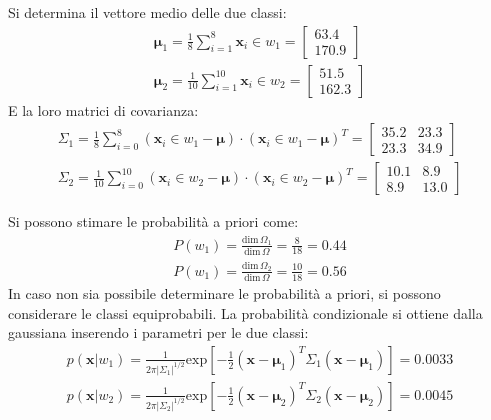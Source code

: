 \documentclass{article}
\numberwithin{equation}{section}
\newcommand{\vect}[1]{\boldsymbol{\mathbf{#1}}}
\begin{document}
Si determina il vettore medio delle due classi:
\begin{gather*}
    \vect{\mu}_1=\displaystyle\frac{1}{8}\sum_{i=1}^{8}\vect{x}_i\in w_1=\begin{bmatrix}
        63.4\\170.9
    \end{bmatrix}\\
    \vect{\mu}_2=\displaystyle\frac{1}{10}\sum_{i=1}^{10}\vect{x}_i\in w_2=\begin{bmatrix}
        51.5\\162.3
    \end{bmatrix}
\end{gather*}
E la loro matrici di covarianza: 
\begin{gather*}
    \Sigma_1=\displaystyle\frac{1}{8}\sum_{i=0}^8(\vect{x}_i\in w_1-\vect{\mu})\cdot(\vect{x}_i\in w_1-\vect{\mu})^T=\begin{bmatrix}
        35.2&23.3\\23.3&34.9
    \end{bmatrix}\\
    \Sigma_2=\displaystyle\frac{1}{10}\sum_{i=0}^{10}(\vect{x}_i\in w_2-\vect{\mu})\cdot(\vect{x}_i\in w_2-\vect{\mu})^T=\begin{bmatrix}
        10.1&8.9\\8.9&13.0
    \end{bmatrix}
\end{gather*}

Si possono stimare le probabilità a priori come:
\begin{gather*}
    P(w_1)=\displaystyle\frac{\text{dim}\,\Omega_1}{\text{dim}\,\Omega}=\frac{8}{18}=0.44\\
    P(w_1)=\displaystyle\frac{\text{dim}\,\Omega_2}{\text{dim}\,\Omega}=\frac{10}{18}=0.56
\end{gather*}
In caso non sia possibile determinare le probabilità a priori, si possono considerare le classi equiprobabili. 
La probabilità condizionale si ottiene dalla gaussiana inserendo i parametri per le due classi:
\begin{gather*}
    p(\vect{x}|w_1)=\displaystyle\frac{1}{2\pi|\Sigma_1|^{1/2}}\text{exp}\left[-\frac{1}{2}(\vect{x}-\vect{\mu}_1)^T\Sigma_1(\vect{x}-\vect{\mu}_1)\right]=0.0033\\
    p(\vect{x}|w_2)=\displaystyle\frac{1}{2\pi|\Sigma_2|^{1/2}}\text{exp}\left[-\frac{1}{2}(\vect{x}-\vect{\mu}_2)^T\Sigma_2(\vect{x}-\vect{\mu}_2)\right]=0.0045
\end{gather*}
\end{document}
